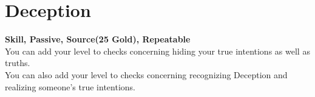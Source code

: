 \section{Deception}\label{sec:deception}
\textbf{Skill, Passive, Source(25 Gold), Repeatable}\\
You can add your level to checks concerning hiding your true intentions as well as truths.\\
You can also add your level to checks concerning recognizing Deception and realizing someone's true intentions.
